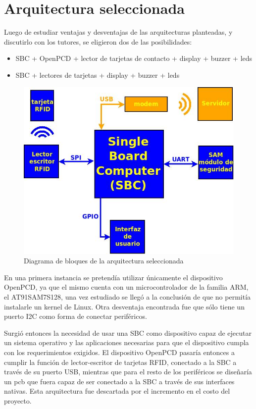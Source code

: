 \newpage
\section{Arquitectura seleccionada}
Luego de estudiar ventajas y desventajas de las arquitecturas planteadas, y discutirlo con los tutores, se eligieron dos de las posibilidades:

\begin{itemize}
\item SBC + OpenPCD + lector de tarjetas de contacto + display + buzzer + leds
\item SBC + lectores de tarjetas + display + buzzer + leds
\end{itemize}

\begin{figure}[H]
\centering
  \begin{center}
  \includegraphics[scale=.5]{Imagenes/diagrama_rf2.jpg} 
  \end{center}
  \caption{Diagrama de bloques de la arquitectura seleccionada}\label{Fig:HW} 
\end{figure}

En una primera instancia se pretendía utilizar únicamente el dispositivo OpenPCD, ya que el mismo cuenta con un microcontrolador de la familia ARM, el AT91SAM7S128, una vez estudiado se llegó a la conclusión de que no permitía instalarle un kernel de Linux. Otra desventaja encontrada fue que sólo tiene un puerto I2C como forma de conectar periféricos.

Surgió entonces la necesidad de usar una SBC como dispositivo capaz de ejecutar un sistema operativo y las aplicaciones necesarias para que el dispositivo cumpla con los requerimientos exigidos. El dispositivo OpenPCD pasaría entonces a cumplir la función de lector-escritor de tarjetas RFID, conectado a la SBC a través de su puerto USB, mientras que para el resto de los periféricos se diseñaría un pcb que fuera capaz de ser conectado a la SBC a través de sus interfaces nativas. Esta arquitectura fue descartada por el incremento en el costo del proyecto.

